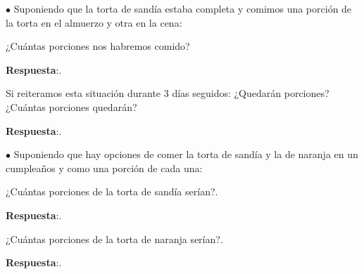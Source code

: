\documentclass[11pt]{examdesign}
\begin{document}
    \begin{multicols}{2}
    	\begin{shortanswer}[title={Pensamos y reflexionamos (escribe en la carpeta tus conclusiones)},
    		,
    		rearrange=no,resetcounter=yes]
    		$\bullet$ Suponiendo que la torta de sandía estaba completa y comimos una porción de la torta en el almuerzo y otra en la cena: 
    		
    		\begin{question}
    			¿Cuántas porciones nos habremos comido?
    			\begin{answer}
    				\textbf{Respuesta}:.
    			\end{answer}
    		\end{question}
    		
    		\begin{question}
    			Si reiteramos esta situación durante 3 días seguidos: ¿Quedarán porciones? ¿Cuántas porciones quedarán?
    			\begin{answer}
    				\textbf{Respuesta}:.
    			\end{answer}
    		\end{question}
    	\end{shortanswer}
        \columnbreak
        \begin{shortanswer}[title={Pensamos y reflexionamos (escribe en la carpeta tus conclusiones)},
        	,
        	rearrange=no,resetcounter=yes]
        	
        	$\bullet$ Suponiendo que hay opciones de comer la torta de sandía y la de naranja en un cumpleaños y como una porción de cada una: 
        	
        	\begin{question}
        		¿Cuántas porciones de la torta de sandía serían?.
        		\begin{answer}
        			\textbf{Respuesta}:.
        		\end{answer}
        	\end{question}
        	
        	\begin{question}
        		¿Cuántas porciones de la torta de naranja serían?.
        		\begin{answer}
        			\textbf{Respuesta}:.
        		\end{answer}
        	\end{question}
        	
        \end{shortanswer}
    \end{multicols}
     
    
\end{document}
